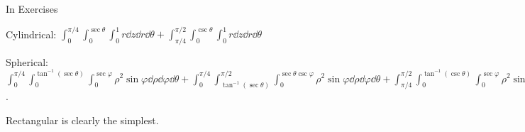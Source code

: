 \begin{exerciseset}{In Exercises}
{Cylindrical: $\int_0^{\pi/4}\int_0^{\sec\theta}\int_{0}^{1}r\dd z\dd r\dd \theta +
 \int_{\pi/4}^{\pi/2}\int_0^{\csc\theta}\int_{0}^{1}r\dd z\dd r\dd \theta$

Spherical: $\int _0^{\pi/4}\int _0^{\tan ^{-1}(\sec \theta)}\int _0^{\sec \varphi}\rho ^2 \sin\varphi\dd \rho\dd \varphi\dd  \theta +
	\int _0^{\pi/4}\int _{\tan ^{-1}(\sec \theta)}^{\pi/2}\int _0^{\sec\theta\csc\varphi}\rho ^2 \sin\varphi\dd \rho\dd \varphi\dd  \theta +
	\int _{\pi/4}^{\pi/2}\int _0^{\tan ^{-1}(\csc \theta)}\int _0^{\sec\varphi}\rho ^2 \sin\varphi\dd \rho\dd \varphi\dd  \theta +
	\int _{\pi/4}^{\pi/2}\int _{\tan ^{-1}(\csc \theta)}^{\pi/2}\int _0^{\csc\theta\csc\varphi}\rho ^2 \sin\varphi\dd \rho\dd \varphi\dd  \theta$.

Rectangular is clearly the simplest.}

\end{exerciseset}
